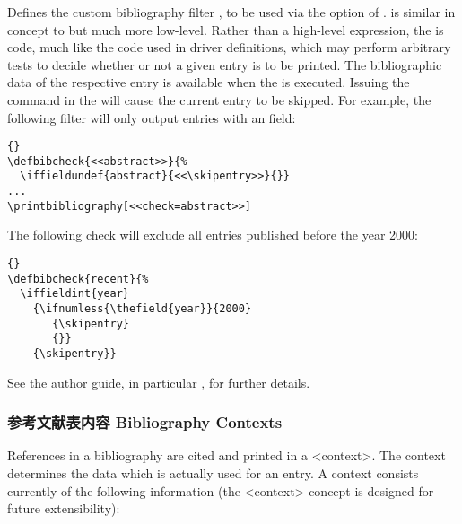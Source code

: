 \begin{ltxsyntax}


Defines the custom bibliography filter , to be used via the  option of .  is similar in concept to  but much more low-level. Rather than a high-level expression, the  is \latex code, much like the code used in driver definitions, which may perform arbitrary tests to decide whether or not a given entry is to be printed. The bibliographic data of the respective entry is available when the  is executed. Issuing the command  in the  will cause the current entry to be skipped. For example, the following filter will only output entries with an  field:

\begin{lstlisting}[style=latex]{}
\defbibcheck{<<abstract>>}{%
  \iffieldundef{abstract}{<<\skipentry>>}{}}
...
\printbibliography[<<check=abstract>>]
\end{lstlisting}
%
The following check will exclude all entries published before the year 2000:

\begin{lstlisting}[style=latex]{}
\defbibcheck{recent}{%
  \iffieldint{year}
    {\ifnumless{\thefield{year}}{2000}
       {\skipentry}
       {}}
    {\skipentry}}
\end{lstlisting}
%
See the author guide, in particular , for further details.

\end{ltxsyntax}

\subsubsection{参考文献表内容 Bibliography Contexts}
\label{use:bib:context}

References in a bibliography are cited and printed in a <context>. The context determines the data which is actually used for an entry. A context consists currently of the following information (the <context> concept is designed for future extensibility):

